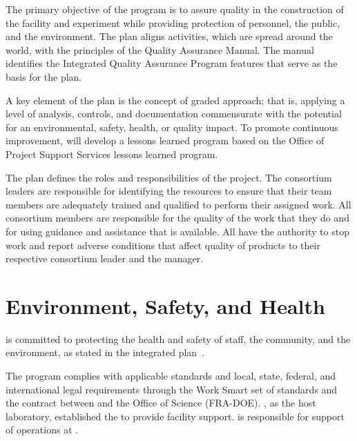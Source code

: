 The primary objective of the   program is
to assure quality in the construction of the  facility and
 experiment while providing protection of
 personnel, the public, and the environment. The
 plan aligns   activities, which
are spread around the world, with the principles of the  Quality
Assurance Manual. The manual identifies the  Integrated Quality
Assurance Program features that serve as the basis for the
  plan.

A key element of the   plan is the
concept of graded approach; that is, applying a level of analysis,
controls, and documentation commensurate with the potential for an
environmental, safety, health, or quality impact. To promote continuous improvement,   will develop a
lessons learned program based on the  Office of Project Support
Services lessons learned program.


The  plan
defines the  roles and responsibilities of the 
project. The  consortium leaders are responsible for identifying the
resources to ensure that their team members are adequately trained and
qualified to perform their assigned work.
All consortium members are responsible for the quality of the work that
they do and for using guidance and assistance that is available. All
have the authority to stop work and report adverse conditions that
affect quality of  products to their respective
 consortium leader and the 
 manager.




\section{Environment, Safety, and Health}
\label{sec:es-tc-eshq}

 is committed to protecting the health and safety of
staff, the community, and the environment, as stated in the
 integrated  plan~\cite{bib:docdb291}.

The   program complies with applicable
standards and local, state, federal, and international legal
requirements through the  Work Smart set of standards and the
contract between  and the 
Office of Science (FRA-DOE). , as the host laboratory,
established the  to provide facility support.
 is responsible for support of 
operations at .

